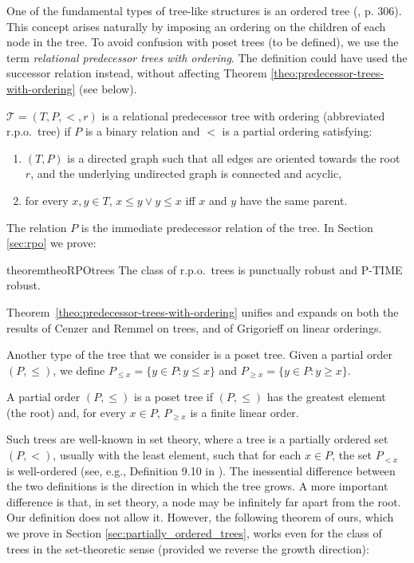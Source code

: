 \documentclass[a4paper,UKenglish,cleveref, autoref, thm-restate]{lipics-v2021}
\begin{document}
One of the fundamental types of tree-like structures is an ordered tree (\cite{knuth_art_1968}, p. 306). This concept arises naturally by imposing an ordering on the children of each node in the tree. To avoid confusion with poset trees (to be defined), we use the term \emph{relational predecessor trees with ordering}. The definition could have used the successor relation instead, without affecting Theorem \ref{theo:predecessor-trees-with-ordering} (see below).

 \begin{definition}[r.p.o. tree]\label{def rpo tree}
     $\mathcal{T}=(T, P, <,r)$ is a relational predecessor tree with ordering (abbreviated r.p.o.~tree) if $P$ is a binary relation and $<$ is a partial ordering satisfying:
     \begin{enumerate}
         \item $(T,P)$ is a directed graph such that all edges are oriented towards the root $r$, and the underlying undirected graph is connected and acyclic,
    \item  for every $x,y \in T$, $x \leq y \vee y \leq x$ iff $x$ and $y$ have the same parent.
     \end{enumerate}
 \end{definition}

The relation $P$ is the immediate predecessor relation of the tree. In Section \ref{sec:rpo} we prove:


\begin{restatable}{theorem}{theoRPOtrees}\label{theo:predecessor-trees-with-ordering}
    The class of r.p.o.~trees is punctually robust and P-TIME robust.
\end{restatable}Theorem~\ref{theo:predecessor-trees-with-ordering} unifies and expands on both the results of Cenzer and Remmel \cite{cenzer_feasible_1998} on trees, and of Grigorieff \cite{grigorieff_every_1990} on linear orderings.

Another type of the tree that we consider is a poset tree. Given a partial order $(P, \leq)$, we define $P_{\leq x} = \{ y \in P: y \leq x\}$ and $P_{\geq x} = \{y \in P: y \geq x\}$. 
\begin{definition}\label{def:partially_ordered_tree}
    A partial order $(P,\leq)$ is a poset tree if $(P,\leq)$ has the greatest element (the root) and, for every $x \in P$, $P_{\geq x}$ is a finite linear order. \end{definition}
Such trees are well-known in set theory, where a tree is a partially ordered set $(P,<)$, usually with the least element, such that for each $x \in P$, the set $P_{<x}$ is well-ordered (see, e.g., Definition 9.10 in \cite{jech_set_2007}). The inessential difference between the two definitions is the direction in which the tree grows. A more important difference is that, in set theory, a node may be infinitely far apart from the root. Our definition does not allow it. However, the following theorem of ours, which we prove in Section \ref{sec:partially_ordered_trees}, works even for the class of trees in the set-theoretic sense (provided we reverse the growth direction):
\end{document}
